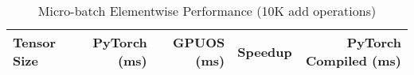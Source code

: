 
\begin{table}[h]
\centering
\caption{Micro-batch Elementwise Performance (10K add operations)}
\begin{tabular}{lrrrr}
\hline
Tensor Size & PyTorch (ms) & GPUOS (ms) & Speedup & PyTorch Compiled (ms) \\
\hline
\hline
\end{tabular}
\end{table}

